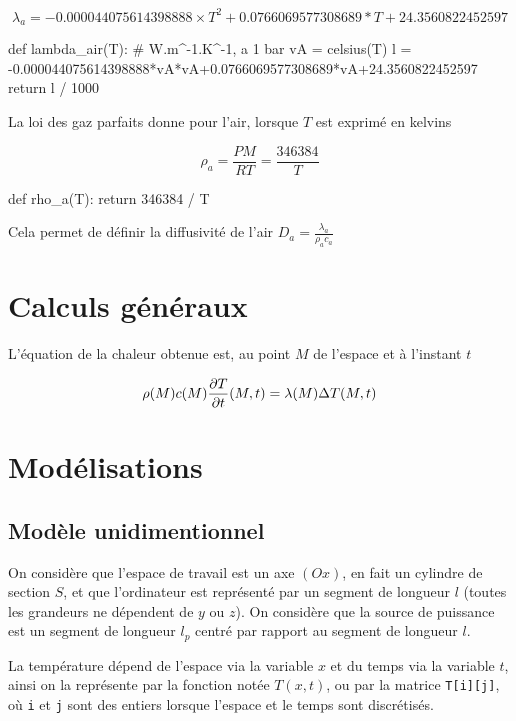 \documentclass{article}
\newcommand{\p}{\texttt} %
\begin{document}
$$\lambda_{a} = -0.000044075614398888 \times T^2 + 0.0766069577308689*T + 24.3560822452597$$

\begin{python}
def lambda_air(T): # W.m^-1.K^-1, a 1 bar
    vA = celsius(T)
    l = -0.000044075614398888*vA*vA+0.0766069577308689*vA+24.3560822452597
    return l / 1000
\end{python}

La loi des gaz parfaits donne pour l'air, lorsque $T$ est exprimé en kelvins

$$\rho_a = \frac{PM}{RT} = \frac{346384}{T}$$

\begin{python}
def rho_a(T):
    return 346384 / T
\end{python}

Cela permet de définir la diffusivité de l'air $D_a = \frac{\lambda_a}{\rho_a c_a}$

\section{Calculs généraux}

L'équation de la chaleur obtenue est, au point $M$ de l'espace et à l'instant $t$

$$\rho(M) c(M) \pdv{T}{t}\/(M, t) = \lambda (M) \Delta T(M, t) $$

\section{Modélisations}

\subsection{Modèle unidimentionnel}

On considère que l'espace de travail est un axe $(Ox)$, en fait un cylindre de section $S$, et que l'ordinateur est représenté par un segment de longueur $l$ (toutes les grandeurs ne dépendent de $y$ ou $z$). On considère que la source de puissance est un segment de longueur $l_p$ centré par rapport au segment de longueur $l$.


La température dépend de l'espace via la variable $x$ et du temps via la variable $t$, ainsi on la représente par la fonction notée $T(x, t)$, ou par la matrice \p{T[i][j]}, où \p{i} et \p{j} sont des entiers lorsque l'espace et le temps sont discrétisés.
\end{document}
